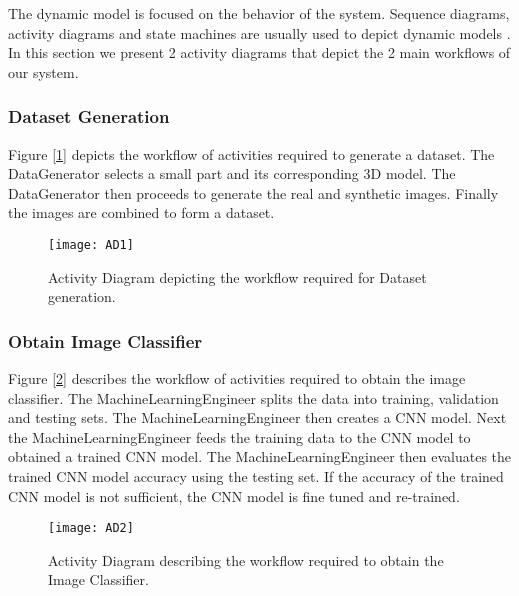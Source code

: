 The dynamic model is focused on the behavior of the system. Sequence diagrams, activity diagrams and state machines are usually used to depict dynamic models \cite{bruegge2004object}. In this section we present 2 activity diagrams that depict the 2 main workflows of our system.

\subsubsection{Dataset Generation}

Figure [\ref{fig:AD1}] depicts the workflow of activities required to generate a dataset. The DataGenerator selects a small part and its corresponding 3D model. The DataGenerator then proceeds to generate the real and synthetic images. Finally the images are combined to form a dataset.

\begin{figure}[H]
\centering
  \texttt{[image: AD1]}
\caption{Activity Diagram depicting the workflow required for Dataset generation.}
\label{fig:AD1}
\end{figure}

\subsubsection{Obtain Image Classifier}

Figure [\ref{fig:AD2}] describes the workflow of activities required to obtain the image classifier. The MachineLearningEngineer splits the data into training, validation and testing sets. The MachineLearningEngineer then creates a CNN model. Next the MachineLearningEngineer feeds the training data to the CNN model to obtained a trained CNN model. The MachineLearningEngineer then evaluates the trained CNN model accuracy using the testing set. If the accuracy of the trained CNN model is not sufficient, the CNN model is fine tuned and re-trained.

\begin{figure}[H]
\centering
  \texttt{[image: AD2]}
\caption{Activity Diagram describing the workflow required to obtain the Image Classifier.}
\label{fig:AD2}
\end{figure}
